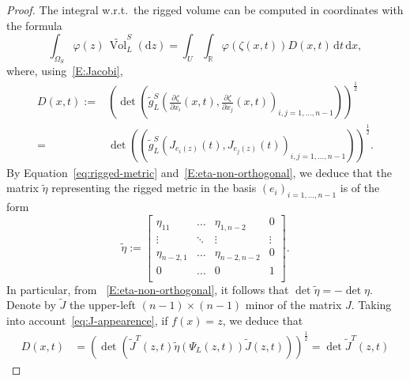 \documentclass[12pt,a4paper]{amsart}
\theoremstyle{plain}
\theoremstyle{definition}
\numberwithin{equation}{section}
\let\phi\varphi
\newcommand{\R}{\mathbb{R}}
\DeclareMathOperator{\vol}{Vol}
\newcommand{\de}{{\mathrm{d}}}
\newcommand{\gflow}{\Psi}
\newcommand{\lparam}{\zeta}
\begin{document}
\begin{proof}
  The integral w.r.t.\ the rigged volume can be computed in
  coordinates with the formula
  \begin{equation}
    \label{eq:rigged-volume-coordinates}
    \int_{\Omega_S}
    \phi(z)
    \,
    \tilde{\vol}_L^S
    (\de z)
    =
    \int_{U}
    \int_{\R}
    \phi(\lparam(x,t))
    D(x,t)
    \,
    \de t\,
    \de x
    ,
  \end{equation}
  where, using~\eqref{E:Jacobi},
  \begin{equation}
    \begin{aligned}
    D(x,t)
      :=
      &
        \left(
    \det
    \left(
      \tilde{g}_L^S\left(
        \frac{\partial\lparam}{\partial x_i}(x,t)
        ,
        \frac{\partial\lparam}{\partial x_j}(x,t)
      \right)_{i,j=1,\dots,n-1}
        \right)
        \right)^{\frac{1}{2}}
      \\
        =
      &
    \det
    \left(
    \left(
      \tilde{g}_L^S\left(
        J_{e_{i}(z)}(t)
        ,
        J_{e_{j}(z)}(t)
      \right)_{i,j=1,\dots,n-1}
        \right)
        \right)^{\frac{1}{2}}
    .
    \end{aligned}
  \end{equation}
  By Equation~\eqref{eq:rigged-metric}
  and~\eqref{E:eta-non-orthogonal}, we deduce that the matrix
  $\tilde\eta$ representing the rigged metric in the basis
  $(e_i)_{i=1,\dots,n-1}$ is of the form
  \begin{equation}\label{E:tilde-eta-non-orthogonal}
  \tilde{\eta}
  :=
  \begin{bmatrix}
    \eta_{11} & \dots &\eta_{1,n-2} & 0 \\
    \vdots & \ddots &\vdots &\vdots\\
    \eta_{n-2,1}&\dots & \eta_{n-2,n-2} &0  \\
    0&\dots & 0 &1  \\
  \end{bmatrix}
  .
\end{equation}
In particular, from ~\eqref{E:eta-non-orthogonal}, it follows that $\det\tilde\eta=-\det\eta$. 
%
Denote by $\tilde J$ the upper-left $(n-1)\times(n-1)$ minor of the
matrix $J$. Taking into account~\eqref{eq:J-appearence}, if $f(x)=z$, we deduce  that
\begin{equation}\label{eq:D(x,t)detJ}
  \begin{aligned}
    D(x,t)
    &
  =
  (\det(\tilde J^T(z,t) \tilde\eta (\gflow_{L}(z,t)) \tilde J(z,t)))^{\frac{1}{2}}
  =
  \det \tilde J^T(z,t)

\end{aligned}
\end{equation}
\end{proof}
\end{document}
